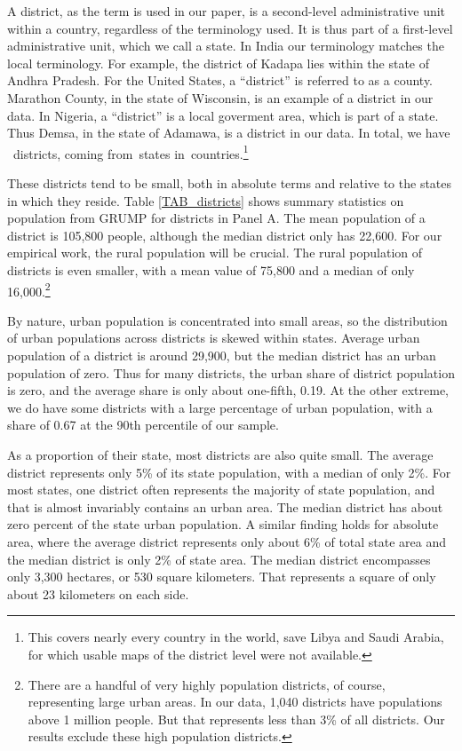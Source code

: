 \documentclass[11pt]{article}
\begin{document}
A district, as the term is used in our paper, is a second-level administrative unit within a country, regardless of the terminology used. It is thus part of a first-level administrative unit, which we call a state. In India our terminology matches the local terminology. For example, the district of Kadapa lies within the state of Andhra Pradesh. For the United States, a ``district'' is referred to as a county. Marathon County, in the state of Wisconsin, is an example of a district in our data. In Nigeria, a ``district'' is a local goverment area, which is part of a state. Thus Demsa, in the state of Adamawa, is a district in our data. In total, we have \districts \ districts, coming from\provinces \ states in\countries \ countries.\footnote{This covers nearly every country in the world, save Libya and Saudi Arabia, for which usable maps of the district level were not available.}

These districts tend to be small, both in absolute terms and relative to the states in which they reside. Table \ref{TAB_districts} shows summary statistics on population from GRUMP \citep{grump2011} for districts in Panel A. The mean population of a district is 105,800 people, although the median district only has 22,600. For our empirical work, the rural population will be crucial. The rural population of districts is even smaller, with a mean value of 75,800 and a median of only 16,000.\footnote{There are a handful of very highly population districts, of course, representing large urban areas. In our data, 1,040 districts have populations above 1 million people. But that represents less than 3\% of all districts. Our results exclude these high population districts.}

By nature, urban population is concentrated into small areas, so the distribution of urban populations across districts is skewed within states. Average urban population of a district is around 29,900, but the median district has an urban population of zero. Thus for many districts, the urban share of district population is zero, and the average share is only about one-fifth, 0.19. At the other extreme, we do have some districts with a large percentage of urban population, with a share of 0.67 at the 90th percentile of our sample.

As a proportion of their state, most districts are also quite small. The average district represents only 5\% of its state population, with a median of only 2\%. For most states, one district often represents the majority of state population, and that is almost invariably contains an urban area. The median district has about zero percent of the state urban population. A similar finding holds for absolute area, where the average district represents only about 6\% of total state area and the median district is only 2\% of state area. The median district encompasses only 3,300 hectares, or 530 square kilometers. That represents a square of only about 23 kilometers on each side. 
\end{document}
